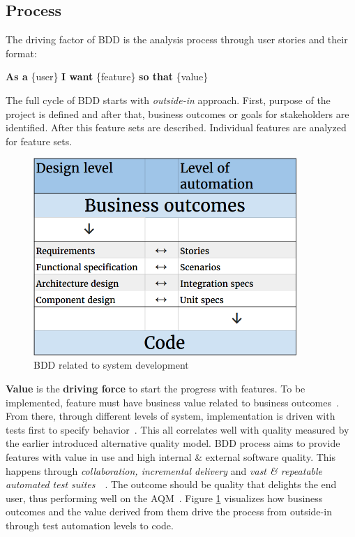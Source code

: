     \subsection{Process}
    The driving factor of BDD is the analysis process through user stories and their format:\newline\
    \begin{addmargin}[2em]{2em}
    \textbf{As a} \{user\}\newline
    \textbf{I want} \{feature\}\newline
    \textbf{so that} \{value\}\newline
    \end{addmargin}
    The full cycle of BDD starts with \textit{outside-in} approach. First, purpose of the project is defined and after that,
    business outcomes or goals for stakeholders are identified. After this feature sets are described.
    Individual features are analyzed for feature sets.~\cite{chelimsky2010rspec}
    \begin{figure}[ht]
      \begin{center}
        \includegraphics[width=10.0cm]{images/BDD.png}
        \caption{BDD related to system development}
        \label{fig:BDD}
      \end{center}
    \end{figure}

    \textbf{Value} is the \textbf{driving force} to start the progress with features.
    To be implemented, feature must have business value related to business outcomes~\cite{bdd2006north}.
    From there, through different levels of system, implementation is driven with tests first to specify behavior~\cite{chelimsky2010rspec}.
    This all correlates well with quality measured by the earlier introduced alternative quality model. BDD
    process aims to provide features with value in use and high internal \& external software quality. This happens through
    \textit{collaboration, incremental delivery} and \textit{vast \& repeatable automated test suites}~\cite{chelimsky2010rspec}~\cite{smart2014bdd}.
    The outcome should be quality that delights the end user, thus performing well on the AQM~\cite{denning2016sq}.
    Figure \ref{fig:BDD} visualizes how business outcomes and the value derived from them drive the process from outside-in through
    test automation levels to code.

